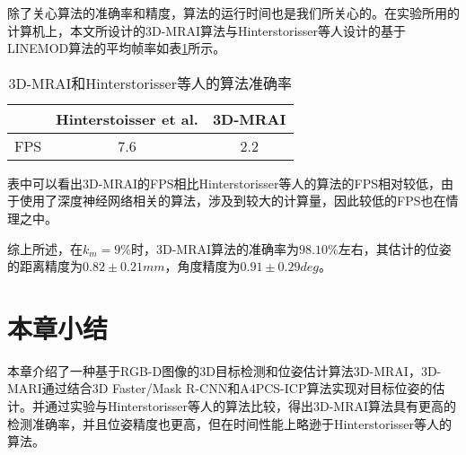 除了关心算法的准确率和精度，算法的运行时间也是我们所关心的。在实验所用的计算机上，本文所设计的3D-MRAI算法与Hinterstorisser等人设计的基于LINEMOD算法的平均帧率如表\ref{tab:mrai-fps}所示。
\begin{table}[ht]
  \centering
  \begin{tabular}{ccc}
    \toprule
    &Hinterstoisser et al.&\bf{3D-MRAI}\\
    \midrule
    FPS&7.6&2.2\\
    \bottomrule
  \end{tabular}
  \caption{3D-MRAI和Hinterstorisser等人的算法准确率}
  \label{tab:mrai-fps}
\end{table}
表中可以看出3D-MRAI的FPS相比Hinterstorisser等人的算法的FPS相对较低，由于使用了深度神经网络相关的算法，涉及到较大的计算量，因此较低的FPS也在情理之中。

综上所述，在$k_m=9\%$时，3D-MRAI算法的准确率为$98.10\%$左右，其估计的位姿的距离精度为$0.82\pm0.21mm$，角度精度为$0.91\pm0.29deg$。

\section{本章小结}
本章介绍了一种基于RGB-D图像的3D目标检测和位姿估计算法3D-MRAI，3D-MARI通过结合3D Faster/Mask R-CNN和A4PCS-ICP算法实现对目标位姿的估计。并通过实验与Hinterstorisser等人的算法比较，得出3D-MRAI算法具有更高的检测准确率，并且位姿精度也更高，但在时间性能上略逊于Hinterstorisser等人的算法。


